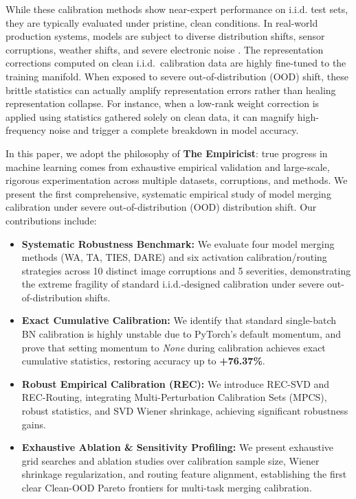 \documentclass{article}
\theoremstyle{plain}
\theoremstyle{definition}
\theoremstyle{remark}
\begin{document}
While these calibration methods show near-expert performance on i.i.d. test sets, they are typically evaluated under pristine, clean conditions. In real-world production systems, models are subject to diverse distribution shifts, sensor corruptions, weather shifts, and severe electronic noise \cite{hendrycks2019benchmarking, mu2019mnistc}. The representation corrections computed on clean i.i.d.\ calibration data are highly fine-tuned to the training manifold. When exposed to severe out-of-distribution (OOD) shift, these brittle statistics can actually amplify representation errors rather than healing representation collapse. For instance, when a low-rank weight correction is applied using statistics gathered solely on clean data, it can magnify high-frequency noise and trigger a complete breakdown in model accuracy.

In this paper, we adopt the philosophy of \textbf{The Empiricist}: true progress in machine learning comes from exhaustive empirical validation and large-scale, rigorous experimentation across multiple datasets, corruptions, and methods. We present the first comprehensive, systematic empirical study of model merging calibration under severe out-of-distribution (OOD) distribution shift. Our contributions include:
\begin{itemize}
    \item \textbf{Systematic Robustness Benchmark:} We evaluate four model merging methods (WA, TA, TIES, DARE) and six activation calibration/routing strategies across 10 distinct image corruptions and 5 severities, demonstrating the extreme fragility of standard i.i.d.-designed calibration under severe out-of-distribution shifts.
    \item \textbf{Exact Cumulative Calibration:} We identify that standard single-batch BN calibration is highly unstable due to PyTorch's default momentum, and prove that setting momentum to \textit{None} during calibration achieves exact cumulative statistics, restoring accuracy up to \textbf{+76.37\%}.
    \item \textbf{Robust Empirical Calibration (REC):} We introduce REC-SVD and REC-Routing, integrating Multi-Perturbation Calibration Sets (MPCS), robust statistics, and SVD Wiener shrinkage, achieving significant robustness gains.
    \item \textbf{Exhaustive Ablation \& Sensitivity Profiling:} We present exhaustive grid searches and ablation studies over calibration sample size, Wiener shrinkage regularization, and routing feature alignment, establishing the first clear Clean-OOD Pareto frontiers for multi-task merging calibration.
\end{itemize}
\end{document}
